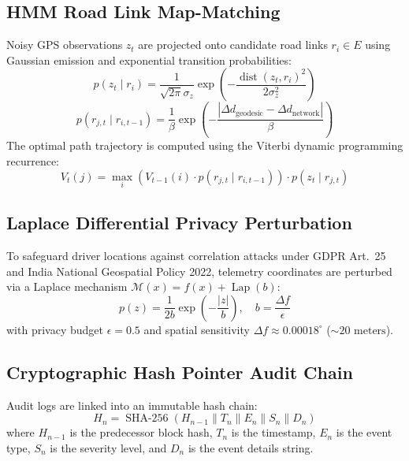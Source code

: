 \documentclass[11pt,a4paper]{article}
\begin{document}
\subsection{HMM Road Link Map-Matching}
Noisy GPS observations $z_t$ are projected onto candidate road links $r_i \in E$ using Gaussian emission and exponential transition probabilities:
\begin{equation}
p(z_t \mid r_i) = \frac{1}{\sqrt{2\pi}\sigma_z} \exp\left(-\frac{\operatorname{dist}(z_t, r_i)^2}{2\sigma_z^2}\right)
\end{equation}
\begin{equation}
p(r_{j,t} \mid r_{i,t-1}) = \frac{1}{\beta} \exp\left(-\frac{|\Delta d_{\text{geodesic}} - \Delta d_{\text{network}}|}{\beta}\right)
\end{equation}
The optimal path trajectory is computed using the Viterbi dynamic programming recurrence:
\begin{equation}
V_t(j) = \max_i \left( V_{t-1}(i) \cdot p(r_{j,t} \mid r_{i,t-1}) \right) \cdot p(z_t \mid r_{j,t})
\end{equation}

\subsection{Laplace Differential Privacy Perturbation}
To safeguard driver locations against correlation attacks under GDPR Art.~25 and India National Geospatial Policy 2022, telemetry coordinates are perturbed via a Laplace mechanism $\mathcal{M}(x) = f(x) + \operatorname{Lap}(b)$:
\begin{equation}
p(z) = \frac{1}{2b} \exp\left(-\frac{|z|}{b}\right), \quad b = \frac{\Delta f}{\epsilon}
\end{equation}
with privacy budget $\epsilon = 0.5$ and spatial sensitivity $\Delta f \approx 0.00018^\circ$ ($\sim 20\text{ meters}$).

\subsection{Cryptographic Hash Pointer Audit Chain}
Audit logs are linked into an immutable hash chain:
\begin{equation}
H_n = \operatorname{SHA-256}\left( H_{n-1} \parallel T_n \parallel E_n \parallel S_n \parallel D_n \right)
\end{equation}
where $H_{n-1}$ is the predecessor block hash, $T_n$ is the timestamp, $E_n$ is the event type, $S_n$ is the severity level, and $D_n$ is the event details string.
\end{document}
